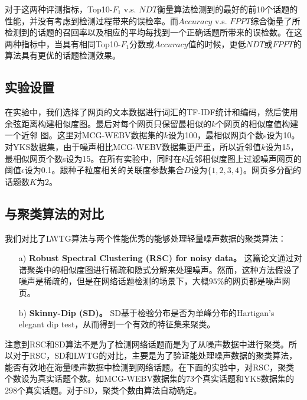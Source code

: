对于这两种评测指标，Top10-$F_1$ v.s. $NDT$衡量算法检测到的最好的前10个话题的性能，并没有考虑到检测过程带来的误检率。而$Accuracy$ v.s. $FPPT$综合衡量了所检测到的话题的召回率以及相应的平均每找到一个正确话题所带来的误检数。在这两种指标中，当具有相同Top10-$F_1$分数或$Accuracy$值的时候，更低$NDT$或$FPPT$的算法具有更优的话题检测效果。


\subsection{实验设置}

在实验中，我们选择了网页的文本数据进行词汇的TF-IDF统计和编码，然后使用余弦距离构建相似度图。最后对每个网页只保留最相似的$k$个网页的相似度值构建一个近邻
图。这里对MCG-WEBV数据集的$k$设为100，最相似网页个数s设为10。对YKS数据集，由于噪声相比MCG-WEBV数据集更严重，所以近邻值$k$设为15，最相似网页个数s设为15。在所有实验中，同时在$k$近邻相似度图上过滤噪声网页的阈值$\epsilon$设为0.1。跟种子粒度相关的关联度参数集合$D$设为$\{1,2,3,4\}$。网页多分配的话题数$K$为2。

\subsection{与聚类算法的对比}

我们对比了LWTG算法与两个性能优秀的能够处理轻量噪声数据的聚类算法：
\begin{enumerate}
  \item[a)] \textbf{Robust Spectral Clustering (RSC) for noisy data\citep{bojchevski2017RSC}。} 这篇论文通过对谱聚类中的相似度图进行稀疏和隐式分解来处理噪声。然而，这种方法假设了噪声是稀疏的，但是在网络话题检测的场景下，大概$95\%$的网页都是噪声网页。
  \item[b)] \textbf{Skinny-Dip (SD)\citep{maurus2016skinny}。} SD基于检验分布是否为单峰分布的Hartigan's elegant dip test，从而得到一个有效的特征集来聚类。
\end{enumerate}

注意到RSC和SD算法不是为了检测网络话题而是为了从噪声数据中进行聚类。所以对于RSC，SD和LWTG的对比，主要是为了验证能处理噪声数据的聚类算法，能否有效地在海量噪声数据中检测到网络话题。在下面的实验中，对RSC，聚类个数设为真实话题个数。如MCG-WEBV数据集的$73$个真实话题和YKS数据集的$298$个真实话题。对于SD，聚类个数由算法自动确定。

